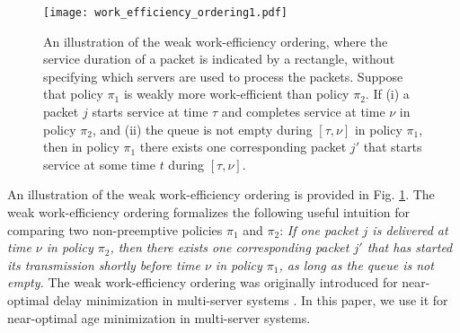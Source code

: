 \begin{figure}
\centering 
\texttt{[image: work\_efficiency\_ordering1.pdf]} \caption{An illustration of the weak work-efficiency ordering, where the service duration of a packet is indicated by a rectangle, without specifying which servers are used to process the packets. 
Suppose that policy $\pi_1$ is {weakly more work-efficient than} policy $\pi_2$. If (i) a packet $j$ starts service at time $\tau$ and completes service at time $\nu$ in policy $\pi_2$, and (ii) the queue is not empty during $[\tau,\nu]$ in policy $\pi_1$, then in policy $\pi_1$ there exists one corresponding packet $j'$ that starts service at some time $t$ during $[\tau,\nu]$. 
}
\label{Work_Efficiency_Ordering} 
\end{figure} 

An illustration of the weak work-efficiency ordering is provided in Fig. \ref{Work_Efficiency_Ordering}. The weak work-efficiency ordering formalizes the following useful intuition for comparing two non-preemptive policies $\pi_1$ and $\pi_2$: \emph{If one packet $j$ is delivered at time $\nu$ in policy $\pi_2$, then  there exists one corresponding packet $j'$ that has started its transmission shortly before time $\nu$  in policy $\pi_1$, as long as the queue is not empty.} %
The weak work-efficiency ordering  was originally introduced for near-optimal delay minimization in multi-server systems \cite{sun2016delay,sun2017delay}. In this paper, we use it for near-optimal age minimization in multi-server systems. 

 

